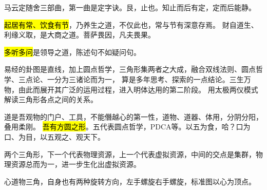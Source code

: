 马云定随舍三部曲，第一曲是定字诀。艮，止也。知止而后有定，定而后能静。

\hl{起居有常、饮食有节}，乃养生之道，不仅此也，常与节有深意存焉。
财自道生、利缘义取，是大商之道。菩萨畏因，凡夫畏果。

\hl{多听多问}是领导之道，陈述句不如疑问句。

易经的卦图是直线，加上圆点哲学，三角形集两者之大成，融合双线法则、圆点哲学、三点论、一分为三诸论而为一，
算是多年思考、探索的一点结论。三生万物，由此而展开其广泛的运用过程，进入明体达用的第二阶段。
用太极两仪模式解读三角形各点之间的关系。

道是吾观物的门户、工具，不能僭越心的第一性，道物、道器、体用，分阴分阳，叠用柔刚。
\hl{吾有方圆之形}。五代表圆点哲学，PDCA等。以五为食，哈？口为口、为目，以五观之、观天下。

两个三角形，下一个代表物理资源，上一个代表虚拟资源，中间的交点是集群，物理资源总而为一，进一步生化出虚拟资源。

心道物三角，自身也有两种旋转方向，左手螺旋右手螺旋，标准图以心为顶点。
